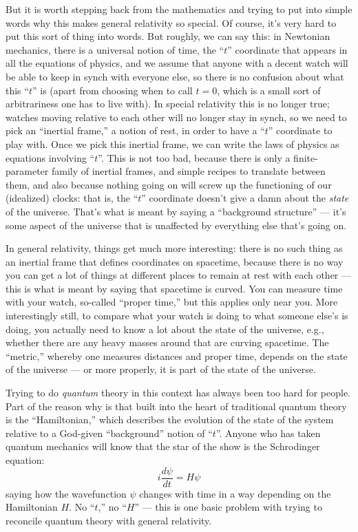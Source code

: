 \documentclass{article}
\begin{document}
But it is worth stepping back from the mathematics and trying to put
into simple words why this makes general relativity so special. Of
course, it's very hard to put this sort of thing into words. But
roughly, we can say this: in Newtonian mechanics, there is a universal
notion of time, the ``\(t\)'' coordinate that appears in all the
equations of physics, and we assume that anyone with a decent watch will
be able to keep in synch with everyone else, so there is no confusion
about what this ``\(t\)'' is (apart from choosing when to call
\(t = 0\), which is a small sort of arbitrariness one has to live with).
In special relativity this is no longer true; watches moving relative to
each other will no longer stay in synch, so we need to pick an
``inertial frame,'' a notion of rest, in order to have a ``\(t\)''
coordinate to play with. Once we pick this inertial frame, we can write
the laws of physics as equations involving ``\(t\)''. This is not too
bad, because there is only a finite-parameter family of inertial frames,
and simple recipes to translate between them, and also because nothing
going on will screw up the functioning of our (idealized) clocks: that
is, the ``\(t\)'' coordinate doesn't give a damn about the \emph{state}
of the universe. That's what is meant by saying a ``background
structure'' --- it's some aspect of the universe that is unaffected by
everything else that's going on.

In general relativity, things get much more interesting: there is no
such thing as an inertial frame that defines coordinates on spacetime,
because there is no way you can get a lot of things at different places
to remain at rest with each other --- this is what is meant by saying
that spacetime is curved. You can measure time with your watch,
so-called ``proper time,'' but this applies only near you. More
interestingly still, to compare what your watch is doing to what someone
else's is doing, you actually need to know a lot about the state of the
universe, e.g., whether there are any heavy masses around that are
curving spacetime. The ``metric,'' whereby one measures distances and
proper time, depends on the state of the universe --- or more properly,
it is part of the state of the universe.

Trying to do \emph{quantum} theory in this context has always been too
hard for people. Part of the reason why is that built into the heart of
traditional quantum theory is the ``Hamiltonian,'' which describes the
evolution of the state of the system relative to a God-given
``background'' notion of ``\(t\)''. Anyone who has taken quantum
mechanics will know that the star of the show is the Schrodinger
equation: \[i\frac{d\psi}{dt} = H\psi\] saying how the wavefunction
\(\psi\) changes with time in a way depending on the Hamiltonian \(H\).
No ``\(t\),'' no ``\(H\)'' --- this is one basic problem with trying to
reconcile quantum theory with general relativity.
\end{document}
